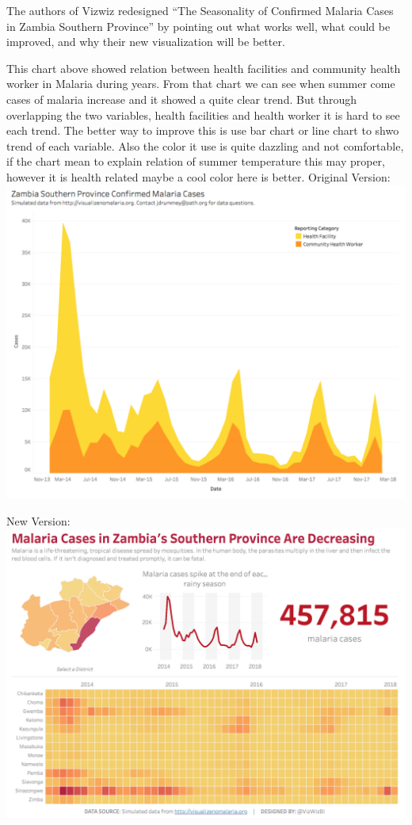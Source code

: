 \documentclass[]{book}
\begin{document}
The authors of Vizwiz redesigned ``The Seasonality of Confirmed Malaria
Cases in Zambia Southern Province'' by pointing out what works well,
what could be improved, and why their new visualization will be better.

This chart above showed relation between health facilities and community
health worker in Malaria during years. From that chart we can see when
summer come cases of malaria increase and it showed a quite clear trend.
But through overlapping the two variables, health facilities and health
worker it is hard to see each trend. The better way to improve this is
use bar chart or line chart to shwo trend of each variable. Also the
color it use is quite dazzling and not comfortable, if the chart mean to
explain relation of summer temperature this may proper, however it is
health related maybe a cool color here is better. Original Version:
\includegraphics{images/malaria_original.png}

New Version: \includegraphics{images/malaria_makeover.png}
\end{document}
